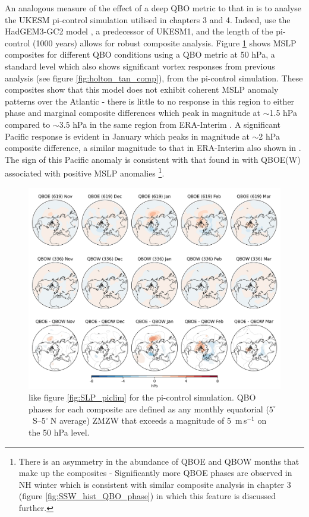 An analogous measure of the effect of a deep QBO metric to that in \cite{andrewsObserved2019d} is to analyse the UKESM pi-control simulation utilised in chapters 3 and 4. Indeed, \cite{andrewsObserved2019d} use the HadGEM3-GC2 model \citep{williamsMet2018b}, a predecessor of UKESM1, and the length of the pi-control (1000 years) allows for robust composite analysis. Figure \ref{fig:SLP_picontrol_50} shows MSLP composites for different QBO conditions using a QBO metric at 50 hPa, a standard level which also shows significant vortex responses from previous analysis (see figure \ref{fig:holton_tan_comp}), from the pi-control simulation. These composites show that this model does not exhibit coherent MSLP anomaly patterns over the Atlantic - there is little to no response in this region to either phase and marginal composite differences which peak in magnitude at $\sim$1.5 hPa compared to $\sim3.5$ hPa in the same region from ERA-Interim \citep{andrewsObserved2019d}. A significant Pacific response is evident in January which peaks in magnitude at $\sim$2 hPa composite difference, a similar magnitude to that in ERA-Interim also shown in \cite{andrewsObserved2019d}. The sign of this Pacific anomaly is consistent with that found in \cite{graySurface2018b} with QBOE(W) associated with positive MSLP anomalies \footnote{There is an asymmetry in the abundance of QBOE and QBOW months that make up the composites - Significantly more QBOE phases are observed in NH winter which is consistent with similar composite analysis in chapter 3 (figure \ref{fig:SSW_hist_QBO_phase}) in which this feature is discussed further.}.

\begin{figure}[h!]
\begin{center}
\noindent\includegraphics[width = 0.8\linewidth]{Figures/Figures-deepQBO/LAGGED_SLP_composites_individual_months_QBO_phases_U_picontrol_50hPa_5thresh.png}
\caption[MSLP composites under 50 hPa QBO phases in the pi-control simulation]{like figure \ref{fig:SLP_piclim} for the pi-control simulation. QBO phases for each composite are defined as any monthly equatorial ($5^{\circ}$\ S--$5^{\circ}\ $N average) ZMZW that exceeds a magnitude of 5\ m\,s$^{-1}$ on the 50 hPa level.}
\label{fig:SLP_picontrol_50}
\end{center}
\end{figure}

